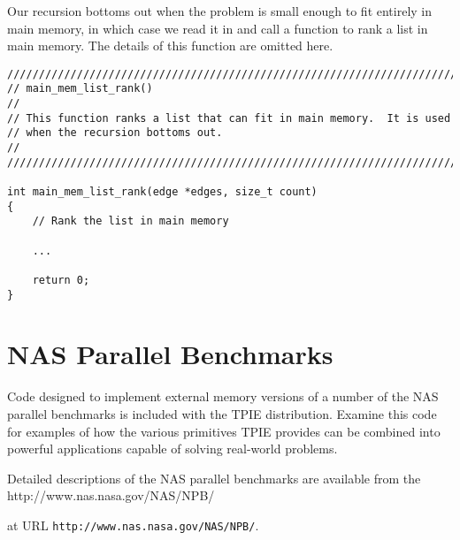 Our recursion bottoms out when the problem is small enough to fit
entirely in main memory, in which case we read it in and call a
function to rank a list in main memory.  The details of this function
are omitted here.

\begin{verbatim}
////////////////////////////////////////////////////////////////////////
// main_mem_list_rank()
//
// This function ranks a list that can fit in main memory.  It is used
// when the recursion bottoms out.
//
////////////////////////////////////////////////////////////////////////

int main_mem_list_rank(edge *edges, size_t count)
{
    // Rank the list in main memory

    ...
        
    return 0;  
}
\end{verbatim}

\section{NAS Parallel Benchmarks}

Code designed to implement external memory versions of a number of the
NAS parallel benchmarks is included with the TPIE distribution.
Examine this code for examples of how the various primitives TPIE
provides can be combined into powerful applications capable of solving
real-world problems.

Detailed descriptions of the NAS parallel benchmarks are available
from the %
{http://www.nas.nasa.gov/NAS/NPB/}
\begin{latexonly}
at URL \verb|http://www.nas.nasa.gov/NAS/NPB/|.
\end{latexonly}
